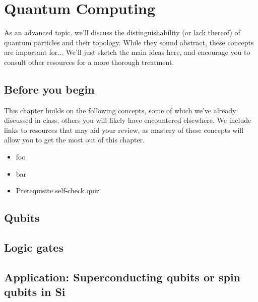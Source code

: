 \documentclass[12pt, english]{book}
\begin{document}
\chapter{Quantum Computing} \label{ch:computing}
As an advanced topic, we'll discuss the distinguishability (or lack thereof) of quantum particles and their topology.
While they sound abstract, these concepts are important for...
We'll just sketch the main ideas here, and encourage you to consult other resources for a more thorough treatment.



\section{Before you begin}

This chapter builds on the following concepts, some of which we've already discussed in class, others you will likely have encountered elsewhere.
We include links to resources that may aid your review, as mastery of these concepts will allow you to get the most out of this chapter.

\begin{itemize}
	\item foo 
	\item bar 
	\item Prerequisite self-check quiz 
\end{itemize}



\section{Qubits}




\section{Logic gates}





\section{Application: Superconducting qubits or spin qubits in Si}
\end{document}
